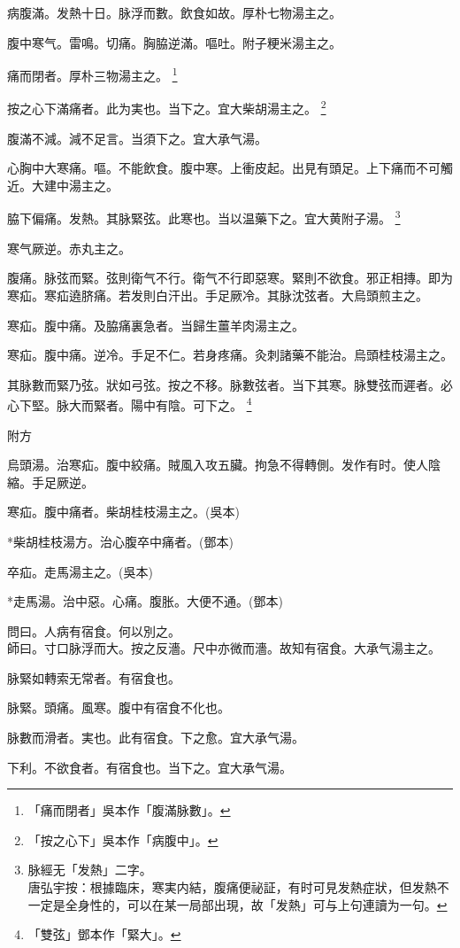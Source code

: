 \documentclass[b5paper,twoside,zihao=-4,UTF8]{ctexbook}
\begin{document}
病腹滿。发熱十日。脉浮而數。飲食如故。厚朴七物湯主之。

腹中寒气。雷鳴。切痛。胸脇逆滿。嘔吐。附子粳米湯主之。

痛而閉者。厚朴三物湯主之。
	\footnote{「痛而閉者」吳本作「腹滿脉數」。}

按之心下滿痛者。此为実也。当下之。宜大柴胡湯主之。
	\footnote{「按之心下」吳本作「病腹中」。}

腹滿不減。減不足言。当須下之。宜大承气湯。

心胸中大寒痛。嘔。不能飲食。腹中寒。上衝皮起。出見有頭足。上下痛而不可觸近。大建中湯主之。

脇下偏痛。{发熱。}其脉緊弦。此寒也。{当}以温藥下之。宜大黄附子湯。
	\footnote{脉經无「发熱」二字。\\唐弘宇按：根據臨床，寒実内結，腹痛便祕証，有时可見发熱症狀，但发熱不一定是全身性的，可以在某一局部出現，故「发熱」可与上句連讀为一句。}

寒气厥逆。赤丸主之。

腹痛。脉弦而緊。弦則衛气不行。{衛气不行}即惡寒。緊則不欲食。邪正相摶。即为寒疝。寒疝遶脐痛。若发則白汗出。手足厥冷。其脉沈弦者。大烏頭煎主之。

寒疝。腹中痛。及脇痛裏急者。当歸生薑羊肉湯主之。

寒疝。腹中痛。逆冷。手足不仁。若身疼痛。灸刺諸藥不能治。烏頭桂枝湯主之。

其脉數而緊乃弦。狀如弓弦。按之不移。脉數弦者。当下其寒。脉雙弦而遲者。必心下堅。脉大而緊者。陽中有陰。可下之。
	\footnote{「雙弦」鄧本作「緊大」。}

附方

烏頭湯。治寒疝。腹中絞痛。賊風入攻五臟。拘急不得轉側。发作有时。使人陰縮。手足厥逆。

寒疝。腹中痛者。柴胡桂枝湯主之。(吳本)

*柴胡桂枝湯方。治心腹卒中痛者。(鄧本)

卒疝。走馬湯主之。(吳本)

*走馬湯。治中惡。心痛。腹胀。大便不通。(鄧本)

問曰。人病有宿食。何以別之。\\
師曰。寸口脉浮而大。按之反濇。尺中亦微而濇。故知有宿食。大承气湯主之。

脉緊如轉索无常者。有宿食也。

脉緊。頭痛。風寒。腹中有宿食不化也。

脉數而滑者。実也。此有宿食。下之愈。宜大承气湯。

下利。不欲食者。有宿食也。当下之。宜大承气湯。
\end{document}
